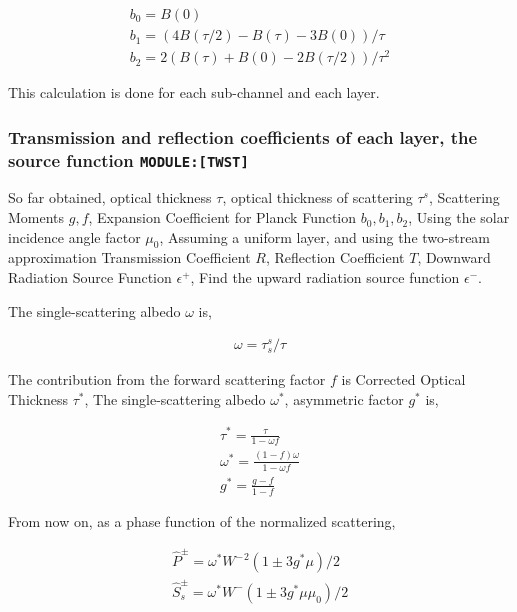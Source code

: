 \begin{eqnarray}
  b_0  =  B(0)  \\
  b_1  =  ( 4B(\tau/2) - B(\tau) - 3B(0) )/\tau  \\
  b_2  =  2 ( B(\tau) + B(0) - 2B(\tau/2) )/\tau^2  
\end{eqnarray}

This calculation is done for each sub-channel and each layer.

\hypertarget{transmission-and-reflection-coefficients-of-each-layer-the-source-function-moduletwst}{%
\subsubsection{\texorpdfstring{Transmission and reflection coefficients
of each layer, the source function
\texttt{MODULE:{[}TWST{]}}}{Transmission and reflection coefficients of each layer, the source function MODULE:{[}TWST{]}}}\label{transmission-and-reflection-coefficients-of-each-layer-the-source-function-moduletwst}}

So far obtained, optical thickness \(\tau\), optical thickness of
scattering \(\tau^s\), Scattering Moments \(g, f\), Expansion
Coefficient for Planck Function \(b_0, b_1, b_2\), Using the solar
incidence angle factor \(\mu_0\), Assuming a uniform layer, and using
the two-stream approximation Transmission Coefficient \(R\), Reflection
Coefficient \(T\), Downward Radiation Source Function \(\epsilon^+\),
Find the upward radiation source function \(\epsilon^-\).

The single-scattering albedo \(\omega\) is,

\begin{eqnarray}
  \omega = \tau_s^s/\tau
\end{eqnarray}

The contribution from the forward scattering factor \(f\) is Corrected
Optical Thickness \(\tau^*\), The single-scattering albedo \(\omega^*\),
asymmetric factor \(g^*\) is,

\begin{eqnarray}
  \tau^*  =  \frac{\tau}{1-\omega f} \\
  \omega^*  =  \frac{(1-f)\omega}{1-\omega f}   \\
  g^*  =  \frac{g-f}{1-f}  
\end{eqnarray}

From now on, as a phase function of the normalized scattering,

\begin{eqnarray}
  \hat{P}^\pm    =  \omega^* {W^-}^2 \left( 1 \pm 3g^* \mu \right)/2 \\
  \hat{S}_s^\pm  =  \omega^* W^-     \left( 1 \pm 3g^* \mu \mu_0 \right)/2
\end{eqnarray}

